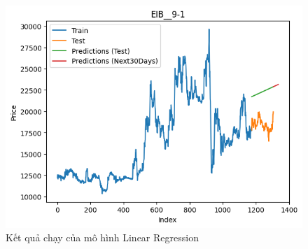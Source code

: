 \begin{figure}[H]
\begin{minipage}{0.15\textwidth}
    \includegraphics[width=1\textwidth]{resources/chapter-5/newdata/result/EIB_LinearRegression_9-1.png}
    \end{minipage}
    \hfill
    
    \caption{Kết quả chạy của mô hình Linear Regression}
    \label{fig:linear_regression_result}
\end{figure}

